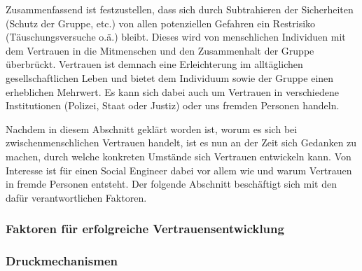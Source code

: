 Zusammenfassend ist festzustellen, dass sich durch Subtrahieren der Sicherheiten (Schutz der Gruppe, etc.) von allen potenziellen Gefahren ein Restrisiko (Täuschungsversuche o.ä.) bleibt.
Dieses wird von menschlichen Individuen mit dem Vertrauen in die Mitmenschen und den Zusammenhalt der Gruppe überbrückt.
Vertrauen ist demnach eine Erleichterung im alltäglichen gesellschaftlichen Leben und bietet dem Individuum sowie der Gruppe einen erheblichen Mehrwert.
Es kann sich dabei auch um Vertrauen in verschiedene Institutionen (Polizei, Staat oder Justiz) oder uns fremden Personen handeln.
\cite{liars-and-outliers}

Nachdem in diesem Abschnitt geklärt worden ist, worum es sich bei zwischenmenschlichen Vertrauen handelt, ist es nun an der Zeit sich Gedanken zu machen, durch welche konkreten Umstände sich Vertrauen entwickeln kann.
Von Interesse ist für einen Social Engineer dabei vor allem wie und warum Vertrauen in fremde Personen entsteht.
Der folgende Abschnitt beschäftigt sich mit den dafür verantwortlichen Faktoren.

\subsubsection{Faktoren für erfolgreiche Vertrauensentwicklung}


\subsubsection{Druckmechanismen}\label{sec:druckmechanismen}

%	


